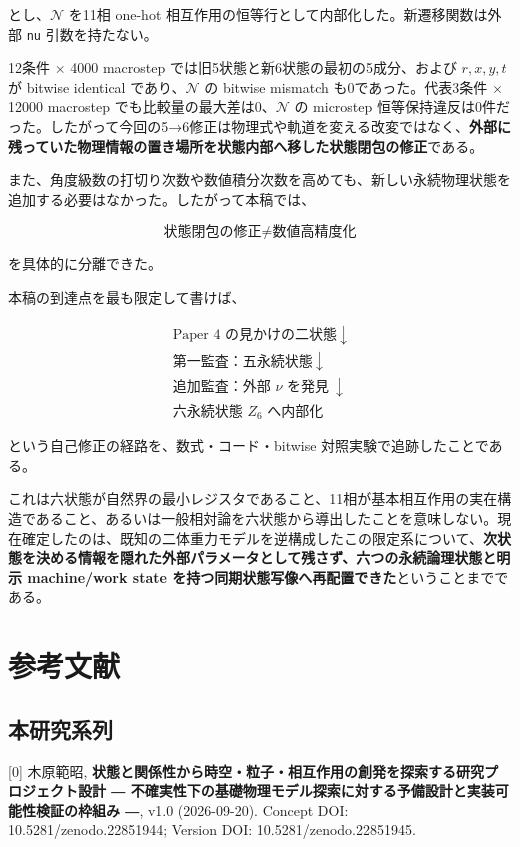 \documentclass[
  a4paper,
]{ltjsarticle}
\begin{document}
とし、\(\mathcal N\) を11相 one-hot
相互作用の恒等行として内部化した。新遷移関数は外部 \texttt{nu}
引数を持たない。

12条件 \(\times\) 4000 macrostep
では旧5状態と新6状態の最初の5成分、および \(r,x,y,t\) が bitwise
identical であり、\(\mathcal N\) の bitwise mismatch
も0であった。代表3条件 \(\times\) 12000 macrostep
でも比較量の最大差は0、\(\mathcal N\) の microstep
恒等保持違反は0件だった。したがって今回の5→6修正は物理式や軌道を変える改変ではなく、\textbf{外部に残っていた物理情報の置き場所を状態内部へ移した状態閉包の修正}である。

また、角度級数の打切り次数や数値積分次数を高めても、新しい永続物理状態を追加する必要はなかった。したがって本稿では、

\[
\boxed{
\text{状態閉包の修正}
\neq
\text{数値高精度化}
}
\]

を具体的に分離できた。

本稿の到達点を最も限定して書けば、

\[
\boxed{
\begin{array}{c}
\text{Paper 4 の見かけの二状態}\
\downarrow\\
\text{第一監査：五永続状態}\
\downarrow\\
\text{追加監査：外部 }\nu\text{ を発見}\
\downarrow\\
\text{六永続状態 }Z_6\text{ へ内部化}
\end{array}
}
\]

という自己修正の経路を、数式・コード・bitwise
対照実験で追跡したことである。

これは六状態が自然界の最小レジスタであること、11相が基本相互作用の実在構造であること、あるいは一般相対論を六状態から導出したことを意味しない。現在確定したのは、既知の二体重力モデルを逆構成したこの限定系について、\textbf{次状態を決める情報を隠れた外部パラメータとして残さず、六つの永続論理状態と明示
machine/work state
を持つ同期状態写像へ再配置できた}ということまでである。

\section{参考文献}\label{ux53c2ux8003ux6587ux732e}

\subsection{本研究系列}\label{ux672cux7814ux7a76ux7cfbux5217}

{[}0{]} 木原範昭,
\textbf{状態と関係性から時空・粒子・相互作用の創発を探索する研究プロジェクト設計
― 不確実性下の基礎物理モデル探索に対する予備設計と実装可能性検証の枠組み
―}, v1.0 (2026-09-20). Concept DOI: 10.5281/zenodo.22851944; Version
DOI: 10.5281/zenodo.22851945.
\end{document}
